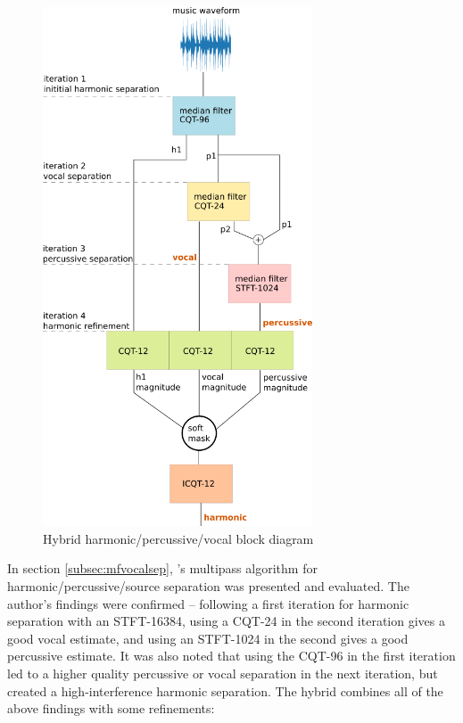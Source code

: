 \documentclass[letter,12pt]{article}
\begin{document}
\begin{figure}
	\includegraphics[width=8cm]{./hybrid_vocal_block_diagram.png}
	\vspace{-1.25em}
	\caption{Hybrid harmonic/percussive/vocal block diagram}
	\label{fig:hybridvocal}
\end{figure}

In section \ref{subsec:mfvocalsep}, \citet{fitzgerald2}'s multipass algorithm for harmonic/percussive/source separation was presented and evaluated. The author's findings were confirmed -- following a first iteration for harmonic separation with an STFT-16384, using a CQT-24 in the second iteration gives a good vocal estimate, and using an STFT-1024 in the second gives a good percussive estimate. It was also noted that using the CQT-96 in the first iteration led to a higher quality percussive or vocal separation in the next iteration, but created a high-interference harmonic separation. The hybrid combines all of the above findings with some refinements:
\end{document}
